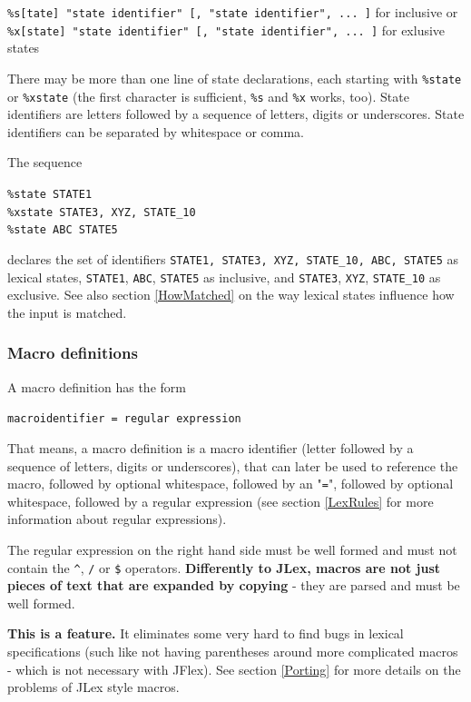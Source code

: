 \documentclass[11pt]{scrartcl}
\begin{document}
\texttt{\%s[tate] "state identifier" [, "state identifier", ... ]} for inclusive or\\
\texttt{\%x[state] "state identifier" [, "state identifier", ... ]} for exlusive states

There may be more than one line of state declarations, each starting with
\texttt{\%state} or \texttt{\%xstate} (the first character is sufficient,
\texttt{\%s} and \texttt{\%x} works, too). State identifiers are letters followed 
by a sequence of letters, digits or underscores. State identifiers can be separated 
by whitespace or comma.

The sequence

\texttt{\%state STATE1}\\
\texttt{\%xstate STATE3, XYZ, STATE\_10}\\
\texttt{\%state ABC STATE5}

declares the set of identifiers \texttt{{STATE1, STATE3, XYZ,
    STATE\_10, ABC, STATE5}} as lexical states, \texttt{STATE1}, \texttt{ABC}, \texttt{STATE5}
as inclusive, and \texttt{STATE3}, \texttt{XYZ}, \texttt{STATE\_10} as exclusive. 
See also section
\ref{HowMatched} on the way lexical states influence how the input is
matched.
 
\subsubsection{Macro definitions\label{MacroDefs}}
A macro definition has the form

\texttt{macroidentifier = regular expression}

That means, a macro definition is a macro identifier (letter followed
by a sequence of letters, digits or underscores), that can later be
used to reference the macro, followed by optional whitespace, followed
by an "\texttt{=}", followed by optional whitespace, followed by a
regular expression (see section \ref{LexRules}  for more information about regular expressions).

The regular expression on the right hand side must be well formed and
must not contain the \verb+^+, \texttt{/} or \texttt{\$} operators. {\bf Differently
to JLex, macros are not just pieces of text that are expanded by copying}
- they are parsed and must be well formed.

{\bf This is a feature.} It eliminates some very hard to find bugs in
lexical specifications (such like not having parentheses around more
complicated macros - which is not necessary with JFlex).  See section
\ref{Porting}  for more
details on the problems of JLex style macros.
\end{document}
